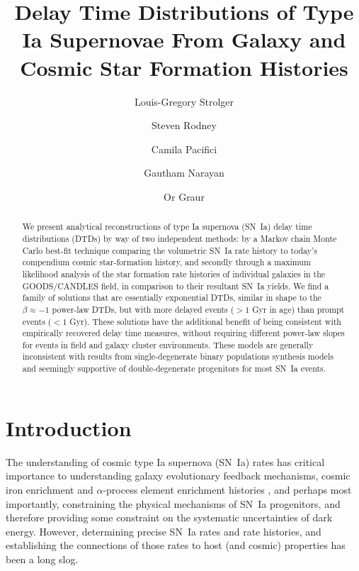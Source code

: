 \documentclass[apj]{aastex62}
\begin{document}
\title{Delay Time Distributions of Type Ia Supernovae From Galaxy and Cosmic Star Formation Histories}
\author[0000-0002-7756-4440]{Louis-Gregory Strolger}

\author{Steven Rodney}

\author{Camila Pacifici}

\author{Gautham Narayan}

\author{Or Graur}

\begin{abstract}
We present analytical reconstructions of type Ia supernova (SN~Ia) delay time distributions (DTDs) by way of two independent methods: by a Markov chain Monte Carlo best-fit technique comparing the volumetric SN~Ia rate history to today's compendium cosmic star-formation history, and secondly through a maximum likelihood analysis of the star formation rate histories of individual galaxies in the GOODS/CANDLES field, in comparison to their resultant SN~Ia yields. We find a family of solutions that are essentially exponential DTDs, similar in shape to the $\beta\approx-1$ power-law DTDs, but with more delayed events ($>1$ Gyr in age) than prompt events ($<1$ Gyr). These solutions have the additional benefit of being consistent with empirically recovered delay time measures, without requiring different power-law slopes for events in field and galaxy cluster environments. These models are generally inconsistent with results from single-degenerate binary populations synthesis models and seemingly supportive of double-degenerate progenitors for most SN~Ia events. 
\end{abstract}

\section{Introduction}
The understanding of cosmic type Ia supernova (SN~Ia) rates has critical importance to understanding galaxy evolutionary feedback mechanisms, cosmic iron enrichment and $\alpha$-process element enrichment histories \citep[see][]{Maoz:2017ck}, and perhaps most importantly, constraining the physical mechanisms of SN~Ia progenitors, and therefore providing some constraint on the systematic uncertainties of dark energy. However, determining precise SN~Ia rates and rate histories, and establishing the connections of those rates to host (and cosmic) properties has been a long slog. 
\end{document}

